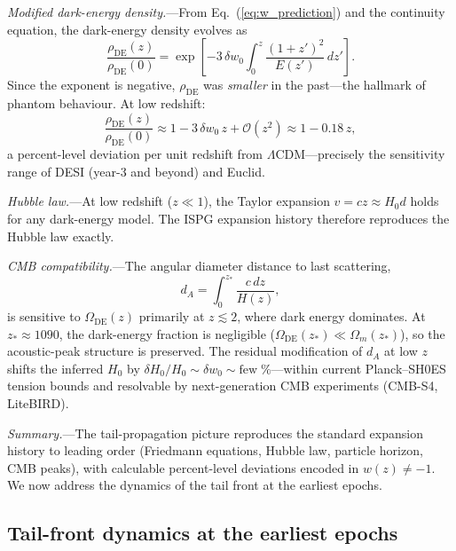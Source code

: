 \documentclass[aps,prd,onecolumn,superscriptaddress,nofootinbib,showpacs,12pt,notitlepage]{revtex4-2}
\renewcommand{\order}[1]{\mathcal{O}\!\left(#1\right)}
\begin{document}
\textit{Modified dark-energy density.}---From
Eq.~(\ref{eq:w_prediction}) and the continuity equation,
the dark-energy density evolves as
\begin{equation}\label{eq:rho_DE_z}
  \frac{\rho_{\mathrm{DE}}(z)}{\rho_{\mathrm{DE}}(0)}
  = \exp\!\left[
    -3\,\delta w_0 \int_0^z
    \frac{(1+z')^{2}}{E(z')}\,dz'
  \right].
\end{equation}
Since the exponent is negative, $\rho_{\mathrm{DE}}$ was
\emph{smaller} in the past---the hallmark of phantom
behaviour.  At low redshift:
\begin{equation}
  \frac{\rho_{\mathrm{DE}}(z)}{\rho_{\mathrm{DE}}(0)}
  \approx 1 - 3\,\delta w_0\,z + \order{z^2}
  \approx 1 - 0.18\,z,
\end{equation}
a percent-level deviation per unit redshift from
$\Lambda$CDM---precisely the sensitivity range of
DESI (year-3 and beyond) and Euclid.

\textit{Hubble law.}---At low redshift ($z \ll 1$),
the Taylor expansion $v = cz \approx H_0 d$ holds
for any dark-energy model.  The ISPG expansion
history therefore reproduces the Hubble law exactly.

\textit{CMB compatibility.}---The angular diameter
distance to last scattering,
\begin{equation}\label{eq:d_A_CMB}
  d_A = \int_0^{z_*}\frac{c\,dz}{H(z)},
\end{equation}
is sensitive to $\Omega_{\mathrm{DE}}(z)$ primarily
at $z \lesssim 2$, where dark energy dominates.
At $z_* \approx 1090$, the dark-energy fraction is
negligible ($\Omega_{\mathrm{DE}}(z_*) \ll
\Omega_m(z_*)$), so the acoustic-peak structure
is preserved.  The residual modification of $d_A$
at low $z$ shifts the inferred $H_0$ by
$\delta H_0/H_0 \sim \delta w_0 \sim \text{few}\;\%$---within
current Planck--SH0ES tension bounds and resolvable
by next-generation CMB experiments (CMB-S4, LiteBIRD).

\textit{Summary.}---The tail-propagation picture
reproduces the standard expansion history to leading
order (Friedmann equations, Hubble law, particle
horizon, CMB peaks), with calculable percent-level
deviations encoded in $w(z) \neq -1$.  We now address
the dynamics of the tail front at the earliest epochs.

\subsection{Tail-front dynamics at the earliest epochs}
\label{sec:early_epoch}
\end{document}
